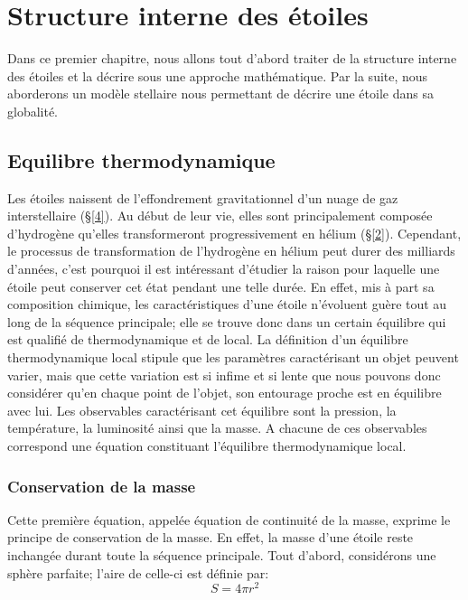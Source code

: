 


\chapter{Structure interne des étoiles}\label{1}
Dans ce premier chapitre, nous allons tout d'abord traiter de la structure interne des étoiles et la décrire sous une approche mathématique. Par la suite, nous aborderons un modèle stellaire nous permettant de décrire une étoile dans sa globalité.

\section{Equilibre thermodynamique}\label{1.1}

Les étoiles naissent de l'effondrement gravitationnel d'un nuage de gaz interstellaire (§\ref{4}). Au début de leur vie, elles sont principalement composée d'hydrogène qu'elles transformeront progressivement en hélium (§\ref{2}). Cependant, le processus de transformation de l'hydrogène en hélium peut durer des milliards d'années, c'est pourquoi il est intéressant d'étudier la raison pour laquelle une étoile peut conserver cet état pendant une telle durée. En effet, mis à part sa composition chimique, les caractéristiques d'une étoile n'évoluent guère tout au long de la séquence principale\footnotemark[1]; elle se trouve donc dans un certain équilibre qui est qualifié de thermodynamique et de local. La définition d'un équilibre thermodynamique local stipule que les paramètres caractérisant un objet peuvent varier, mais que cette variation est si infime et si lente que nous pouvons donc considérer qu'en chaque point de l'objet, son entourage proche est en équilibre avec lui. Les observables caractérisant cet équilibre sont la pression, la température, la luminosité ainsi que la masse. A chacune de ces observables correspond une équation constituant l'équilibre thermodynamique local.

\subsection{Conservation de la masse}\label{1.1.1}
Cette première équation, appelée équation de continuité de la masse, exprime le principe de conservation de la masse. En effet, la masse d'une étoile reste inchangée durant toute la séquence principale.\smallskip\newline
Tout d'abord, considérons une sphère parfaite\footnotemark[2]; l'aire de celle-ci est définie par:\begin{equation} S=4\pi r^{2}\label{Eq. 1.1}\end{equation}


